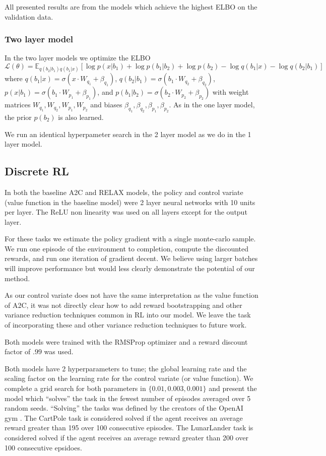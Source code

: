 \documentclass{article}
\newcommand{\E}{\mathbb{E}}
\begin{document}
All presented results are from the models which achieve the highest ELBO on the validation data.

\subsubsection{Two layer model}
In the two layer models we optimize the ELBO $$\mathcal{L}(\theta) = \E_{q(b_2|b_1)q(b_1|x)}[\log p(x|b_1) + \log p(b_1|b_2) + \log p(b_2) - \log q(b_1|x) - \log q(b_2|b_1)]$$ where $q(b_1|x) = \sigma(x\cdot W_{q_1} + \beta_{q_1})$, $q(b_2|b_1) = \sigma(b_1\cdot W_{q_2} + \beta_{q_2})$, $p(x| b_1) = \sigma(b_1\cdot W_{p_1} + \beta_{p_1})$, and $p(b_1| b_2) = \sigma(b_2\cdot W_{p_2} + \beta_{p_2})$ with weight matrices $W_{q_1},W_{q_2},W_{p_1},W_{p_2}$ and biases $\beta_{q_1},\beta_{q_2},\beta_{p_1},\beta_{p_2}$. As in the one layer model, the prior $p(b_2)$ is also learned.

We run an identical hyperpameter search in the 2 layer model as we do in the 1 layer model. 


\subsection{Discrete RL}
In both the baseline A2C and RELAX models, the policy and control variate (value function in the baseline model) were 2 layer neural networks with 10 units per layer. The ReLU non linearity was used on all layers except for the output layer.

For these tasks we estimate the policy gradient with a single monte-carlo sample. We run one episode of the environment to completion, compute the discounted rewards, and run one iteration of gradient decent. We believe using larger batches will improve performance but would less clearly demonstrate the potential of our method. 

As our control variate does not have the same interpretation as the value function of A2C, it was not directly clear how to add reward bootstrapping and other variance reduction techniques common in RL into our model. We leave the task of incorporating these and other variance reduction techniques to future work.  

Both models were trained with the RMSProp \cite{Tieleman2012} optimizer and a reward discount factor of $.99$ was used.

Both models have 2 hyperparameters to tune; the global learning rate and the scaling factor on the learning rate for the control variate (or value function). We complete a grid search for both parameters in $\{0.01, 0.003, 0.001\}$ and present the model which ``solves'' the task in the fewest number of episodes averaged over 5 random seeds. ``Solving'' the tasks was defined by the creators of the OpenAI gym \cite{1606.01540}. The CartPole task is considered solved if the agent receives an average reward greater than 195 over 100 consecutive episodes. The LunarLander task is considered solved if the agent receives an average reward greater than 200 over 100 consecutive epsidoes. 
\end{document}
